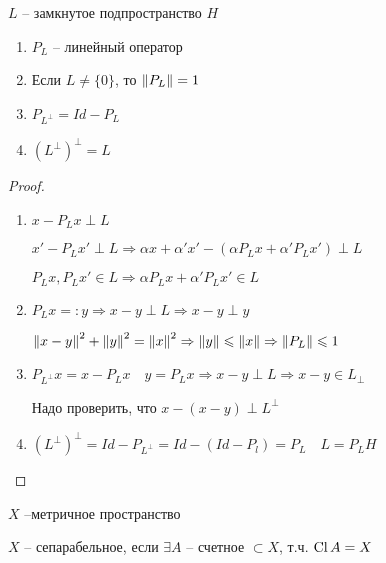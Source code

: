\begin{theorem}\thmslashn 
	
	$L $ -- замкнутое подпространство $H$
	
	\begin{enumerate}
		\item 
		$P_L$ -- линейный оператор 
		
		\item
		Если $L \not = \{0\}$, то $\left\|P_{L}\right\| = 1$
		
		\item
		$P_{L^\perp} = Id - P_L$
		
		\item
		$(L^\perp)^\perp = L$
		
	\end{enumerate}
	
\end{theorem}

\begin{proof}\thmslashn
	
	\begin{enumerate}
		\item 
		$x - P_Lx \perp L$
		
		$x' - P_Lx' \perp L \Rightarrow \alpha x + \alpha' x' - \left( \alpha P_L x + \alpha'P_Lx' \right)\perp L$
		
		$P_Lx, P_Lx' \in L \Rightarrow \alpha P_L x + \alpha'P_Lx'  \in L$
	
		\item
		$P_L x =: y \Rightarrow x - y \perp L \Rightarrow x - y \perp y$
		
		$\left\|x - y\right\|^2 + \left\|y\right\|^2 = \left\|x\right\|^2 \Rightarrow \left\|y\right\| \leqslant \left\|x\right\| \Rightarrow \left\|P_L\right\| \leqslant 1$
		
		\item
		$P_{L^\perp}x = x - P_Lx\quad y = P_L x \Rightarrow x - y \perp L \Rightarrow x - y \in L_\perp$
		
		Надо проверить, что $x - (x - y) \perp L^\perp$
		
		\item
		$(L^\perp)^\perp = Id - P_{L^\perp} = Id - (Id - P_l) = P_L\quad L = P_L H$
		
	\end{enumerate}
	
\end{proof}

\begin{definition}\thmslashn
	
	$X$ --метричное пространство 
	
	$X$ -- сепарабельное, если $\exists A$ -- счетное $\subset X$, т.ч. $\operatorname{Cl} A = X$
	
\end{definition}

